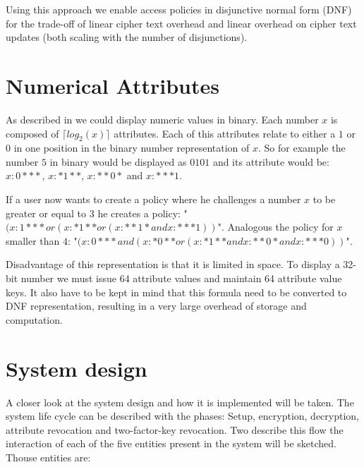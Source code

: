 Using this approach we enable access policies in disjunctive normal form (DNF) for the trade-off of linear cipher text overhead and linear overhead on cipher text updates (both scaling with the number of disjunctions).

\section{Numerical Attributes}
As described in \cite{bethencourt2007ciphertext} we could display numeric values in binary. Each number $x$ is composed of $\lceil log_2(x) \rceil$ attributes. Each of this attributes relate to either a $1$ or $0$ in one position in the binary number representation of $x$. So for example the number $5$ in binary would be displayed as $0101$ and its attribute would be: $x:0***$, $x:*1**$, $x:**0*$ and $x:***1$. 

If a user now wants to create a policy where he challenges a number $x$ to be greater or equal to $3$ he creates a policy: "$(x:1*** or (x:*1** or (x:**1* and x:***1))$". Analogous the policy for $x$ smaller than $4$: "$(x:0*** and (x:*0** or (x:*1** and x:**0* and x:***0))$".

Disadvantage of this representation is that it is limited in space. To display a 32-bit number we must issue 64 attribute values and maintain 64 attribute value keys. It also have to be kept in mind that this formula need to be converted to DNF representation, resulting in a very large overhead of storage and computation.

\section{System design}
A closer look at the system design and how it is implemented will be taken. The system life cycle can be described with the phases: Setup, encryption, decryption, attribute revocation and two-factor-key revocation. Two describe this flow the interaction of each of the five entities present in the system will be sketched. Thouse entities are:

